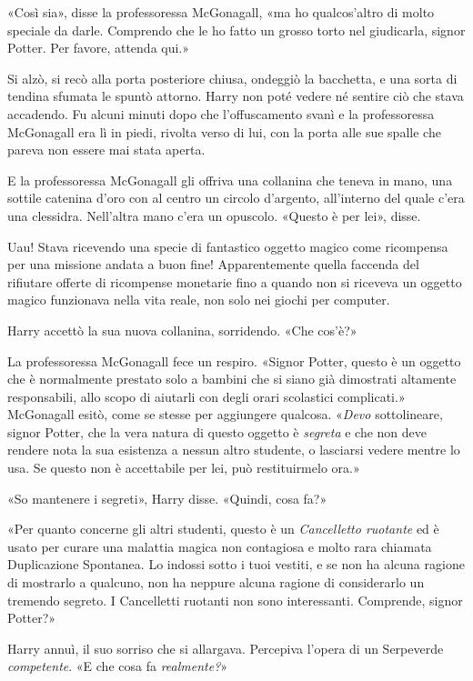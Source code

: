 «Così sia», disse la professoressa McGonagall, «ma ho qualcos’altro di molto speciale da darle. Comprendo che le ho fatto un grosso torto nel giudicarla, signor Potter. Per favore, attenda qui.»

Si alzò, si recò alla porta posteriore chiusa, ondeggiò la bacchetta, e una sorta di tendina sfumata le spuntò attorno. Harry non poté vedere né sentire ciò che stava accadendo. Fu alcuni minuti dopo che l’offuscamento svanì e la professoressa McGonagall era lì in piedi, rivolta verso di lui, con la porta alle sue spalle che pareva non essere mai stata aperta.

E la professoressa McGonagall gli offriva una collanina che teneva in mano, una sottile catenina d’oro con al centro un circolo d’argento, all’interno del quale c’era una clessidra. Nell’altra mano c’era un opuscolo. «Questo è per lei», disse.

Uau! Stava ricevendo una specie di fantastico oggetto magico come ricompensa per una missione andata a buon fine! Apparentemente quella faccenda del rifiutare offerte di ricompense monetarie fino a quando non si riceveva un oggetto magico funzionava nella vita reale, non solo nei giochi per computer.

Harry accettò la sua nuova collanina, sorridendo. «Che cos’è?»

La professoressa McGonagall fece un respiro. «Signor Potter, questo è un oggetto che è normalmente prestato solo a bambini che si siano già dimostrati altamente responsabili, allo scopo di aiutarli con degli orari scolastici complicati.» McGonagall esitò, come se stesse per aggiungere qualcosa. «\textit{Devo} sottolineare, signor Potter, che la vera natura di questo oggetto è \textit{segreta} e che non deve rendere nota la sua esistenza a nessun altro studente, o lasciarsi vedere mentre lo usa. Se questo non è accettabile per lei, può restituirmelo ora.»

«So mantenere i segreti», Harry disse. «Quindi, cosa fa?»

«Per quanto concerne gli altri studenti, questo è un \textit{Cancelletto ruotante} ed è usato per curare una malattia magica non contagiosa e molto rara chiamata Duplicazione Spontanea. Lo indossi sotto i tuoi vestiti, e se non ha alcuna ragione di mostrarlo a qualcuno, non ha neppure alcuna ragione di considerarlo un tremendo segreto. I Cancelletti ruotanti non sono interessanti. Comprende, signor Potter?»

Harry annuì, il suo sorriso che si allargava. Percepiva l’opera di un Serpeverde \textit{competente}. «E che cosa fa \textit{realmente?}»

